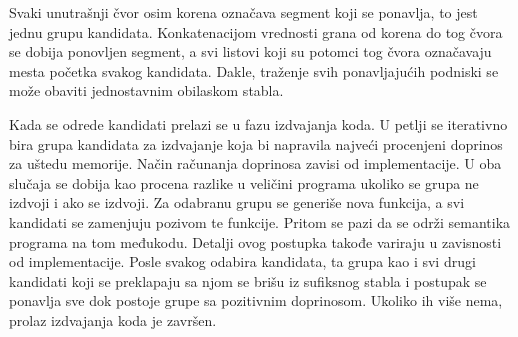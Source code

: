 \documentclass[12pt,oneside]{memoir}
\begin{document}
Svaki unutrašnji čvor osim korena označava segment koji se ponavlja, to jest jednu grupu kandidata.
Konkatenacijom vrednosti grana od korena do tog čvora se dobija ponovljen segment, a svi listovi koji su potomci tog čvora označavaju mesta početka svakog kandidata.
Dakle, traženje svih ponavljajućih podniski se može obaviti jednostavnim obilaskom stabla.


Kada se odrede kandidati prelazi se u fazu izdvajanja koda.
U petlji se iterativno bira grupa kandidata za izdvajanje koja bi napravila najveći procenjeni doprinos za uštedu memorije.
Način računanja doprinosa zavisi od implementacije.
U oba slučaja se dobija kao procena razlike u veličini programa ukoliko se grupa ne izdvoji i ako se izdvoji.
Za odabranu grupu se generiše nova funkcija, a svi kandidati se zamenjuju pozivom te funkcije.
Pritom se pazi da se održi semantika programa na tom međukodu.
Detalji ovog postupka takođe variraju u zavisnosti od implementacije.
Posle svakog odabira kandidata, ta grupa kao i svi drugi kandidati koji se preklapaju sa njom se brišu iz sufiksnog stabla i postupak se ponavlja sve dok postoje grupe sa pozitivnim doprinosom.
Ukoliko ih više nema, prolaz izdvajanja koda je završen.





\end{document}
